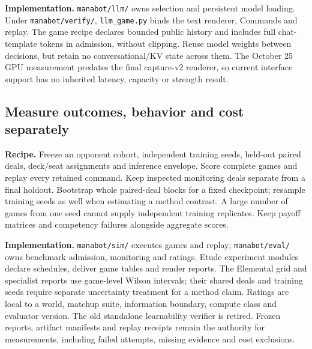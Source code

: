 \documentclass[11pt]{article}
\newcommand{\code}[1]{\texttt{\small #1}}
\begin{document}
\textbf{Implementation.} \code{manabot/llm/} owns selection and persistent model loading. Under \code{manabot/verify/}, \code{llm\_game.py} binds the text renderer, Commands and replay. The game recipe declares bounded public history and includes full chat-template tokens in admission, without clipping. Reuse model weights between decisions, but retain no conversational/KV state across them. The October 25 GPU measurement predates the final capture-v2 renderer, so current interface support has no inherited latency, capacity or strength result.

\subsection{Measure outcomes, behavior and cost separately}

\textbf{Recipe.} Freeze an opponent cohort, independent training seeds, held-out paired deals, deck/seat assignments and inference envelope. Score complete games and replay every retained command. Keep inspected monitoring deals separate from a final holdout. Bootstrap whole paired-deal blocks for a fixed checkpoint; resample training seeds as well when estimating a method contrast. A large number of games from one seed cannot supply independent training replicates. Keep payoff matrices and competency failures alongside aggregate scores.

\textbf{Implementation.} \code{manabot/sim/} executes games and replay; \code{manabot/eval/} owns benchmark admission, monitoring and ratings. Etude experiment modules declare schedules, deliver game tables and render reports. The Elemental grid and specialist reports use game-level Wilson intervals; their shared deals and training seeds require separate uncertainty treatment for a method claim. Ratings are local to a world, matchup suite, information boundary, compute class and evaluator version. The old standalone learnability verifier is retired. Frozen reports, artifact manifests and replay receipts remain the authority for measurements, including failed attempts, missing evidence and cost exclusions.



\end{document}
